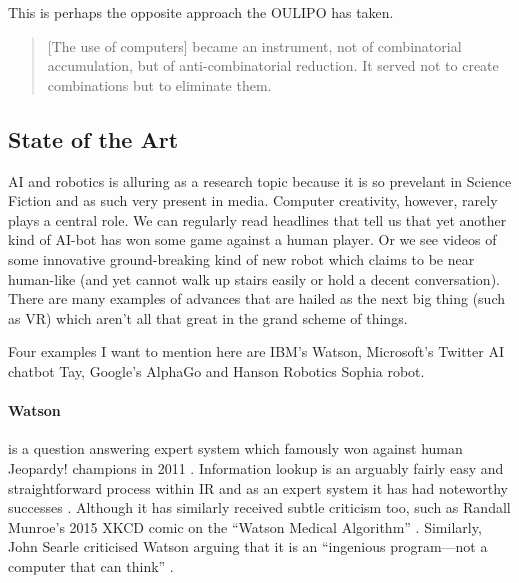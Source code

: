 This is perhaps the opposite approach the \ac{OULIPO} has taken.

\begin{quotation}
  [The use of computers] became an instrument, not of combinatorial accumulation, but of anti-combinatorial reduction. It served not to create combinations but to eliminate them. 
\end{quotation}


\subsection{State of the Art}

\ac{AI} and robotics is alluring as a research topic because it is so prevelant in Science Fiction and as such very present in media. Computer creativity, however, rarely plays a central role. We can regularly read headlines that tell us that yet another kind of \ac{AI}-bot has won some game against a human player. Or we see videos of some innovative ground-breaking kind of new robot which claims to be near human-like (and yet cannot walk up stairs easily or hold a decent conversation). There are many examples of advances that are hailed as the next big thing (such as \ac{VR}) which aren't all that great in the grand scheme of things. 

Four examples I want to mention here are IBM's Watson, Microsoft's Twitter \ac{AI} chatbot Tay, Google's AlphaGo and Hanson Robotics Sophia robot.

\paragraph{Watson} is a question answering expert system which famously won against human Jeopardy! champions in 2011 \autocite{IBM2016}. Information lookup is an arguably fairly easy and straightforward process within \ac{IR} and as an expert system it has had noteworthy successes \autocite{Fingas2016}. Although it has similarly received subtle criticism too, such as Randall Munroe's 2015 XKCD comic on the ``Watson Medical Algorithm'' \autocite*{Munroe2015}. Similarly, John Searle criticised Watson arguing that it is an ``ingenious program---not a computer that can think'' \autocite*{Searle2016}.

